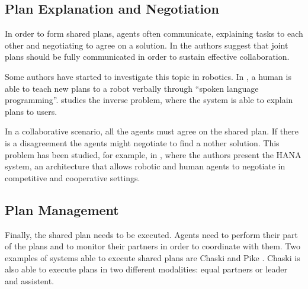 \subsection{Plan Explanation and Negotiation}
In order to form  shared plans, agents often communicate, explaining tasks to each other and negotiating to agree on a solution. In \cite{Lallee2013} the authors suggest that joint plans should be fully communicated in order to sustain effective collaboration. 

Some authors have started to investigate this topic in robotics. In \cite{Petit2012}, a human is able to teach new plans to a robot verbally through ``spoken language programming''. \cite{Sorce2015} studies the inverse problem, where the system is able to explain plans to users. 

In a collaborative scenario, all the agents must agree on the shared plan. If there is a disagreement the agents might negotiate to find a nother solution.  This problem has been studied, for example, in \cite{fabregues2014hana}, where the authors present the HANA system, an architecture that allows robotic and human agents to negotiate in competitive and cooperative settings.

\subsection{Plan Management}
Finally, the shared plan needs to be executed. Agents need to perform their part of the plans and to monitor their partners in order to coordinate with them. Two examples of systems able to execute shared plans are  Chaski \cite{shah2011improved} and Pike \cite{karpas2015robust}. Chaski is also able to execute plans in two different modalities: equal partners or leader and assistent.

